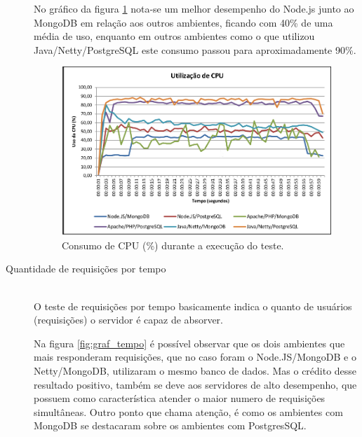 \begin{description}
No gráfico da figura \ref{fig:graf_cpu} nota-se um melhor desempenho do Node.js junto ao MongoDB em relação aos outros ambientes, ficando com 40\% de uma média de uso, enquanto em outros ambientes como o que utilizou Java/Netty/PostgreSQL este consumo passou para aproximadamente 90\%.

\begin{figure}[htb]
\centering
\includegraphics[scale=0.5]{images/graf_cpu.png}
\caption{Consumo de CPU (\%) durante a execução do teste. \cite{NodejsEMongodb}}
\label{fig:graf_cpu}
\end{figure}

\clearpage
\item[Quantidade de requisições por tempo] \hfill \\
O teste de requisições por tempo basicamente indica o quanto de usuários (requisições) o servidor é capaz de absorver.\cite{NodejsEMongodb}

Na figura \ref{fig:graf_tempo} é possível observar que os dois ambientes que mais responderam requisições, que no caso foram o Node.JS/MongoDB e o Netty/MongoDB, utilizaram o mesmo banco de dados. Mas o crédito desse resultado positivo, também se deve aos servidores de alto desempenho, que possuem como característica atender o maior numero de requisições simultâneas. Outro ponto que chama atenção, é como os ambientes com MongoDB se destacaram sobre os ambientes com PostgresSQL.


\end{description}

